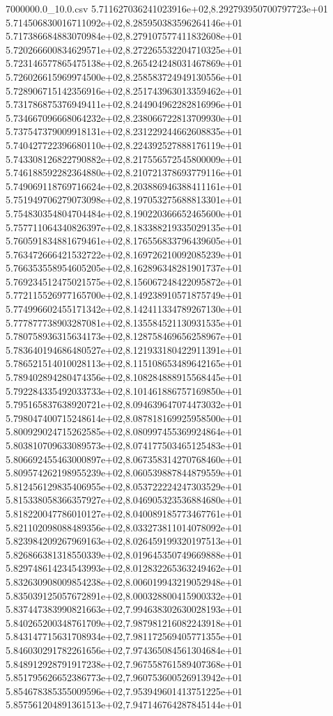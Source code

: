 \begin{filecontents*}{7000000.0_10.0.csv}
5.711627036241023916e+02,8.292793950700797723e+01
5.714506830016711092e+02,8.285950383596264146e+01
5.717386684883070984e+02,8.279107577411832608e+01
5.720266600834629571e+02,8.272265532204710325e+01
5.723146577865475138e+02,8.265424248031467869e+01
5.726026615969974500e+02,8.258583724949130556e+01
5.728906715142356916e+02,8.251743963013359462e+01
5.731786875376949411e+02,8.244904962282816996e+01
5.734667096668064232e+02,8.238066722813709930e+01
5.737547379009918131e+02,8.231229244662608835e+01
5.740427722396680110e+02,8.224392527888176119e+01
5.743308126822790882e+02,8.217556572545800009e+01
5.746188592282364880e+02,8.210721378693779116e+01
5.749069118769716624e+02,8.203886946388411161e+01
5.751949706279073098e+02,8.197053275688813301e+01
5.754830354804704484e+02,8.190220366652465600e+01
5.757711064340826397e+02,8.183388219335029135e+01
5.760591834881679461e+02,8.176556833796439605e+01
5.763472666421532722e+02,8.169726210092085239e+01
5.766353558954605205e+02,8.162896348281901737e+01
5.769234512475021575e+02,8.156067248422095872e+01
5.772115526977165700e+02,8.149238910571875749e+01
5.774996602455171342e+02,8.142411334789267130e+01
5.777877738903287081e+02,8.135584521130931535e+01
5.780758936315634173e+02,8.128758469656258967e+01
5.783640194686480527e+02,8.121933180422911391e+01
5.786521514010028113e+02,8.115108653489642165e+01
5.789402894280474356e+02,8.108284888915568445e+01
5.792284335492033733e+02,8.101461886757169850e+01
5.795165837638920721e+02,8.094639647074473032e+01
5.798047400715248614e+02,8.087818169925958500e+01
5.800929024715262585e+02,8.080997455369924864e+01
5.803810709633089573e+02,8.074177503465125483e+01
5.806692455463000897e+02,8.067358314270768460e+01
5.809574262198955239e+02,8.060539887844879559e+01
5.812456129835406955e+02,8.053722224247303529e+01
5.815338058366357927e+02,8.046905323536884680e+01
5.818220047786010127e+02,8.040089185773467761e+01
5.821102098088489356e+02,8.033273811014078092e+01
5.823984209267969163e+02,8.026459199320197513e+01
5.826866381318550339e+02,8.019645350749669888e+01
5.829748614234543993e+02,8.012832265363249462e+01
5.832630908009854238e+02,8.006019943219052948e+01
5.835039125057672891e+02,8.000328800415900332e+01
5.837447383990821663e+02,7.994638302630028193e+01
5.840265200348761709e+02,7.987981216082243918e+01
5.843147715631708934e+02,7.981172569405771355e+01
5.846030291782261656e+02,7.974365084561304684e+01
5.848912928791917238e+02,7.967558761589407368e+01
5.851795626652386773e+02,7.960753600526913942e+01
5.854678385355009596e+02,7.953949601413751225e+01
5.857561204891361513e+02,7.947146764287845144e+01

\end{filecontents*}

